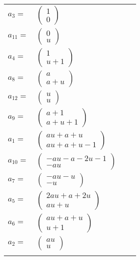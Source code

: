 \documentclass[1p]{elsarticle_modified}
\theoremstyle{definition}
\begin{document}
\begin{tabular}{m{7pt} m{180pt} m{7pt} m{180pt} }
\flushright $a_{3}=$&$\begin{pmatrix}1\\0\end{pmatrix}$ \\
\flushright $a_{11}=$&$\begin{pmatrix}0\\u\end{pmatrix}$ \\
\flushright $a_{4}=$&$\begin{pmatrix}1\\u+1\end{pmatrix}$ \\
\flushright $a_{8}=$&$\begin{pmatrix}a\\a+u\end{pmatrix}$ \\
\flushright $a_{12}=$&$\begin{pmatrix}u\\u\end{pmatrix}$ \\
\flushright $a_{9}=$&$\begin{pmatrix}a+1\\a+u+1\end{pmatrix}$ \\
\flushright $a_{1}=$&$\begin{pmatrix}a u+a+u\\a u+a+u-1\end{pmatrix}$ \\
\flushright $a_{10}=$&$\begin{pmatrix}- a u- a-2 u-1\\- a u\end{pmatrix}$ \\
\flushright $a_{7}=$&$\begin{pmatrix}- a u- u\\- u\end{pmatrix}$ \\
\flushright $a_{5}=$&$\begin{pmatrix}2 a u+a+2 u\\a u+u\end{pmatrix}$ \\
\flushright $a_{6}=$&$\begin{pmatrix}a u+a+u\\u+1\end{pmatrix}$ \\
\flushright $a_{2}=$&$\begin{pmatrix}a u\\u\end{pmatrix}$\\&\end{tabular}
\end{document}
